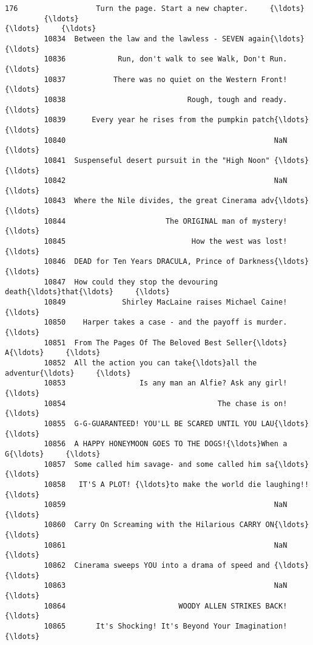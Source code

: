 \documentclass[11pt]{article}
\begin{document}
\begin{Verbatim}[commandchars=\\\{\}]
         176                  Turn the page. Start a new chapter.     {\ldots}        
         {\ldots}                                                  {\ldots}     {\ldots}        
         10834  Between the law and the lawless - SEVEN again{\ldots}     {\ldots}        
         10836            Run, don't walk to see Walk, Don't Run.     {\ldots}        
         10837           There was no quiet on the Western Front!     {\ldots}        
         10838                            Rough, tough and ready.     {\ldots}        
         10839      Every year he rises from the pumpkin patch{\ldots}     {\ldots}        
         10840                                                NaN     {\ldots}        
         10841  Suspenseful desert pursuit in the "High Noon" {\ldots}     {\ldots}        
         10842                                                NaN     {\ldots}        
         10843  Where the Nile divides, the great Cinerama adv{\ldots}     {\ldots}        
         10844                       The ORIGINAL man of mystery!     {\ldots}        
         10845                             How the west was lost!     {\ldots}        
         10846  DEAD for Ten Years DRACULA, Prince of Darkness{\ldots}     {\ldots}        
         10847  How could they stop the devouring death{\ldots}that{\ldots}     {\ldots}        
         10849             Shirley MacLaine raises Michael Caine!     {\ldots}        
         10850    Harper takes a case - and the payoff is murder.     {\ldots}        
         10851  From The Pages Of The Beloved Best Seller{\ldots} A{\ldots}     {\ldots}        
         10852  All the action you can take{\ldots}all the adventur{\ldots}     {\ldots}        
         10853                 Is any man an Alfie? Ask any girl!     {\ldots}        
         10854                                   The chase is on!     {\ldots}        
         10855  G-G-GUARANTEED! YOU'LL BE SCARED UNTIL YOU LAU{\ldots}     {\ldots}        
         10856  A HAPPY HONEYMOON GOES TO THE DOGS!{\ldots}When a G{\ldots}     {\ldots}        
         10857  Some called him savage- and some called him sa{\ldots}     {\ldots}        
         10858   IT'S A PLOT! {\ldots}to make the world die laughing!!     {\ldots}        
         10859                                                NaN     {\ldots}        
         10860  Carry On Screaming with the Hilarious CARRY ON{\ldots}     {\ldots}        
         10861                                                NaN     {\ldots}        
         10862  Cinerama sweeps YOU into a drama of speed and {\ldots}     {\ldots}        
         10863                                                NaN     {\ldots}        
         10864                          WOODY ALLEN STRIKES BACK!     {\ldots}        
         10865       It's Shocking! It's Beyond Your Imagination!     {\ldots}        
         

\end{Verbatim}
\end{document}
